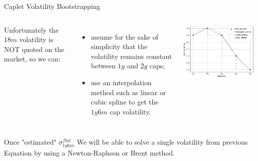 \documentclass{beamer}
\begin{document}
\begin{frame}{Caplet Volatility Bootstrapping}
\begin{columns}
Unfortunately the $18m$ volatility is NOT quoted on the market, so we can:
\begin{itemize}
	\item assume for the sake of simplicity that the volatility remains constant between $1y$ and $2y$ caps;
	\item use an interpolation method such as linear or cubic spline to get the $1y6m$ cap volatility.
\end{itemize}
\begin{center}
\includegraphics[width=0.8\linewidth]{images/flat_volatilities}
\end{center}
\end{columns}
Once "estimated" $\sigma^{flat}_{1y6m}$ We will be able to solve a single volatility from previous Equation by using a Newton-Raphson or Brent method.
\end{frame}
\end{document}
